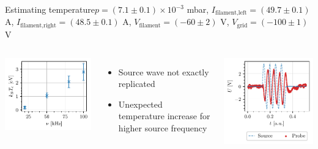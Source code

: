 \documentclass[10pt]{beamer}
\begin{document}
\begin{frame}{Estimating temperature}{$p = (7.1 \pm 0.1) \times 10^{-3}$ mbar, $I_\text{filament,left} = (49.7 \pm 0.1)$ A, $I_\text{filament,right} = (48.5 \pm 0.1)$ A, $V_\text{filament} = (-60 \pm 2)$ V, $V_\text{grid} = (-100 \pm 1)$ V}
    \begin{columns}
        \centering
        \includegraphics[scale=1]{../figures/ion_acoustic_temperature.pdf}
        \begin{itemize}
            \item Source wave not exactly replicated
            \item Unexpected temperature increase for higher source frequency
        \end{itemize}
        
        \centering
        \vspace{-0.62cm}
        \includegraphics[scale=1]{../figures/ion_acoustic_wave.pdf}
    \end{columns}
\end{frame}
\end{document}
